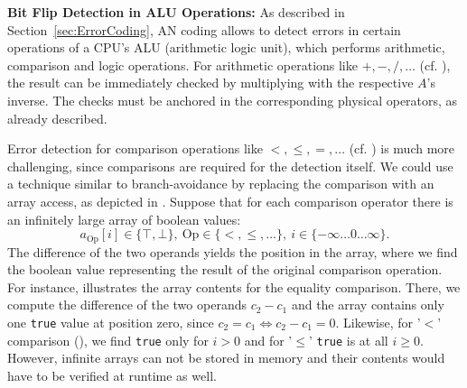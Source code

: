 \textbf{Bit Flip Detection in ALU Operations:}
As described in Section~\ref{sec:ErrorCoding}, AN coding allows to detect errors in certain operations of a CPU's ALU (arithmetic logic unit), which performs arithmetic, comparison and logic operations. For arithmetic operations like \(+,-,/,\dots\) (cf. ), the result can be immediately checked by multiplying with the respective \(A\)'s inverse. The checks must be anchored in the corresponding physical operators, as already described.

Error detection for comparison operations like \(<,\leq,=,\dots\) (cf. ) is much more challenging, since comparisons are required for the detection itself. We could use a technique similar to branch-avoidance by replacing the comparison with an array access, as depicted in . Suppose that for each comparison operator there is an infinitely large array of boolean values:
\[
	a_\text{Op}[i]\in\{\top,\bot\}, ~ \text{Op}\in\{<,\leq,\dots\}, ~ i\in\{-\infty\dots0\dots\infty\}.
\]
The difference of the two operands yields the position in the array, where we find the boolean value representing the result of the original comparison operation. For instance,  illustrates the array contents for the equality comparison. There, we compute the difference of the two operands \(c_2-c_1\) and the array contains only one \texttt{true} value at position zero, since \(c_2=c_1 \Leftrightarrow c_2-c_1=0\). Likewise, for '$<$' comparison (), we find \texttt{true} only for \(i>0\) and for '$\leq$' \texttt{true} is at all \(i\geq0\). However, infinite arrays can not be stored in memory and their contents would have to be verified at runtime as well.

